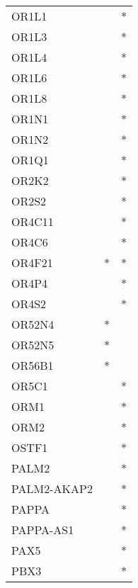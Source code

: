\begin{longtable}{lcc}
OR1L1                 &                &          * \\
OR1L3                 &                &          * \\
OR1L4                 &                &          * \\
OR1L6                 &                &          * \\
OR1L8                 &                &          * \\
OR1N1                 &                &          * \\
OR1N2                 &                &          * \\
OR1Q1                 &                &          * \\
OR2K2                 &                &          * \\
OR2S2                 &                &          * \\
OR4C11                &                &          * \\
OR4C6                 &                &          * \\
OR4F21                &              * &          * \\
OR4P4                 &                &          * \\
OR4S2                 &                &          * \\
OR52N4                &              * &            \\
OR52N5                &              * &            \\
OR56B1                &              * &            \\
OR5C1                 &                &          * \\
ORM1                  &                &          * \\
ORM2                  &                &          * \\
OSTF1                 &                &          * \\
PALM2                 &                &          * \\
PALM2-AKAP2           &                &          * \\
PAPPA                 &                &          * \\
PAPPA-AS1             &                &          * \\
PAX5                  &                &          * \\
PBX3                  &                &          * \\

\end{longtable}

